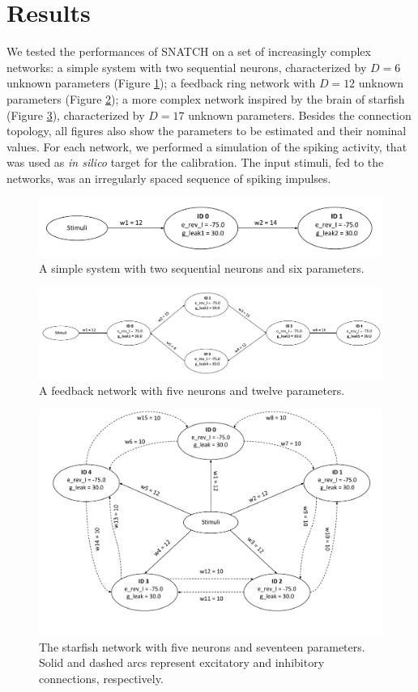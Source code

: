 \documentclass[utf8]{frontiersFPHY} %
\newcommand {\name}{SNATCH}
\begin{document}
\section{Results}
\label{sec:results}

We tested the performances of \name{} on a set of increasingly complex networks: a simple system with two sequential neurons, characterized by $D=6$ unknown parameters (Figure \ref{fig:topology-2neurons}); a feedback ring network with $D=12$ unknown parameters (Figure \ref{fig:topology-feedback}); a more complex network inspired by the brain of starfish (Figure \ref{fig:topology-starfish}), characterized by $D=17$ unknown parameters.
Besides the connection topology, all figures also show the parameters to be estimated and their nominal values.
For each network, we performed a simulation of the spiking activity, that was used as \emph{in silico} target for the calibration.
The input stimuli, fed to the networks, was an irregularly spaced sequence of spiking impulses.

\begin{figure}[!ht]
	\centering
	\includegraphics[width=.6\textwidth]{images/topologies/2_neurons_topology.pdf}
	\caption{A simple system with two sequential neurons and six parameters.}
	\label{fig:topology-2neurons}
\end{figure}
\begin{figure}[tb]
	\centering
	\includegraphics[width=\textwidth]{images/topologies/ring_topology.pdf}
	\caption{A feedback network with five neurons and twelve parameters.}
	\label{fig:topology-feedback}
\end{figure}
\begin{figure}[tb]
	\centering
	\includegraphics[width=.7\textwidth]{images/topologies/starfish_topology.pdf}
	\caption{The starfish network with five neurons and seventeen parameters. Solid and dashed arcs represent excitatory and inhibitory connections, respectively.}
	\label{fig:topology-starfish}
\end{figure}
\end{document}
